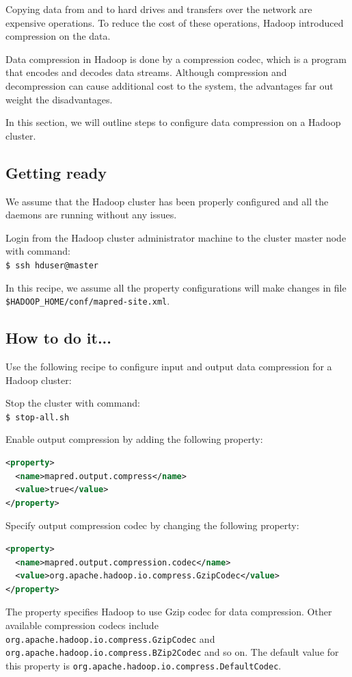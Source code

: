 Copying data from and to hard drives and transfers over the network are expensive operations. To reduce the cost of these operations, Hadoop introduced compression on the data.

Data compression in Hadoop is done by a compression codec, which is a program that encodes and decodes data streams. Although compression and decompression can cause additional cost to the system, the advantages far out weight the disadvantages.

In this section, we will outline steps to configure data compression on a Hadoop cluster.

\subsection*{Getting ready}
We assume that the Hadoop cluster has been properly configured and all the daemons are running without any issues.

Login from the Hadoop cluster administrator machine to the cluster master node with command: \\
\verb|$ ssh hduser@master|

In this recipe, we assume all the property configurations will make changes in file \verb|$HADOOP_HOME/conf/mapred-site.xml|.
\subsection*{How to do it...}
Use the following recipe to configure input and output data compression for a Hadoop cluster:

Stop the cluster with command: \\
\verb|$ stop-all.sh|

Enable output compression by adding the following property:
\lstset{style=bashstyle}
\begin{lstlisting}[language=XML]
<property>
  <name>mapred.output.compress</name>
  <value>true</value>
</property>
\end{lstlisting}

Specify output compression codec by changing the following property:
\lstset{style=bashstyle}
\begin{lstlisting}[language=XML]
<property>
  <name>mapred.output.compression.codec</name>
  <value>org.apache.hadoop.io.compress.GzipCodec</value>
</property>
\end{lstlisting}

The property specifies Hadoop to use Gzip codec for data compression. Other available compression codecs include \verb|org.apache.hadoop.io.compress.GzipCodec| and \verb|org.apache.hadoop.io.compress.BZip2Codec| and so on. The default value for this property is \verb|org.apache.hadoop.io.compress.DefaultCodec|.

